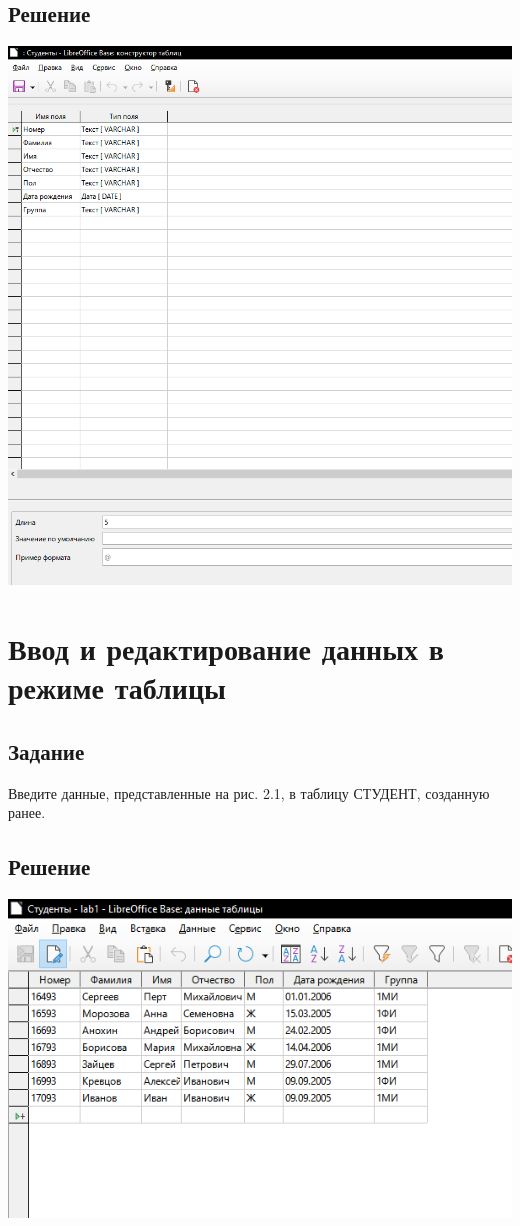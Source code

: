 \documentclass[a4paper, 12pt]{article}
\begin{document}
\subsection{Решение}
\includegraphics[width=\textwidth]{"1-1.png"}\\

\section{Ввод и редактирование данных в режиме таблицы }
\subsection{Задание}
Введите данные, представленные на рис. 2.1, в таблицу  СТУДЕНТ, 
созданную ранее. 
\subsection{Решение}
\includegraphics[width=\textwidth]{"1-2.png"}\\
\end{document}
